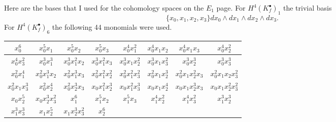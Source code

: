 \documentclass[10pt,oneside,reqno]{amsart}
\begin{document}
\begin{flushleft}
		\newpage
		
		Here are the bases that I used for the cohomology spaces on the $E_1$ page.  For $H^4(K_f^{\bullet})_1$ the trivial basis
		\begin{equation*}
			\{x_0,x_1,x_2,x_3\}dx_0\wedge dx_1\wedge dx_2\wedge dx_3.
		\end{equation*}
		For $H^4(K_f^{\bullet})_6$ the following 44 monomials were used.
		
		\vspace{3mm}
			
		\begin{center}
			\begin{tabular}{ |c|c|c|c|c|c|c|c| }
				\hline
				\rule{0pt}{2.5ex}$x_0^6$ & $x_0^5x_1$ & $x_0^5x_2$ & $x_0^5x_3$ & $x_0^4x_1^2$ & $x_0^4x_1x_2$ & $x_0^4x_1x_3$ & $x_0^4x_2^2$ \\
				\hline
				\rule{0pt}{2.5ex}$x_0^4x_3^2$ & $x_0^3x_1^3$ & $x_0^3x_1^2x_2$ & $x_0^3x_1^2x_3$ & $x_0^3x_1x_2^2$ & $x_0^3x_1x_3^2$ & $x_0^3x_2^3$ & $x_0^3x_3^3$ \\
				\hline
				\rule{0pt}{2.5ex}$x_0^2x_1^4$ & $x_0^2x_1^3x_2$ & $x_0^2x_1^3x_3$ & $x_0^2x_1^2x_2^2$ & $x_0^2x_1^2x_3^2$ & $x_0^2x_1x_2^3$ & $x_0^2x_1x_2^2x_3$ & $x_0^2x_1x_2x_3^2$ \\
				\hline
				\rule{0pt}{2.5ex}$x_0^2x_1x_3^3$ & $x_0^2x_2^4$ & $x_0^2x_2^3x_3$ & $x_0x_1^2x_2^3$ & $x_0x_1^2x_3^3$ & $x_0x_1x_2^4$ & $x_0x_1x_2^3x_3$ & $x_0x_1x_2^2x_3^2$ \\
				\hline
				\rule{0pt}{2.5ex}$x_0x_2^5$ & $x_0x_2^3x_3^2$ & $x_1^6$ & $x_1^5x_2$ & $x_1^5x_3$ & $x_1^4x_2^2$ & $x_1^4x_3^2$ & $x_1^3x_2^3$ \\
				\hline
				\rule{0pt}{2.5ex}$x_1^3x_3^3$ & $x_1x_2^5$ & $x_1x_2^3x_3^2$ & $x_2^6$ & \multicolumn{4}{r}{} \\ \cline{1-4}
			\end{tabular}
		\end{center}
	
		\vspace{3mm}
	

\end{flushleft}
\end{document}
